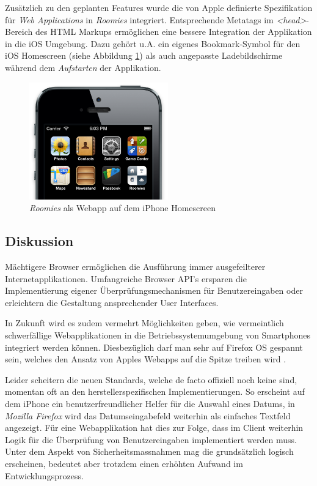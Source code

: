 Zusätzlich zu den geplanten Features wurde die von Apple definierte Spezifikation für \emph{Web Applications} \cite{SafariWebApp} in \emph{Roomies} integriert. Entsprechende Metatags im \emph{<head>}-Bereich des HTML Markups ermöglichen eine bessere Integration der Applikation in die iOS Umgebung. Dazu gehört u.A. ein eigenes Bookmark-Symbol für den iOS Homescreen (siehe Abbildung \ref{fig:webapp-homescreen-icon}) als auch angepasste Ladebildschirme während dem \emph{Aufstarten} der Applikation.

\begin{figure}[H]
	\centering
	\includegraphics[width=6cm]{content/principle-demonstration/images/ios-webapp-homescreenicon.png}
	\caption{\emph{Roomies} als Webapp auf dem iPhone Homescreen}
	\label{fig:webapp-homescreen-icon}
\end{figure}


\subsection*{Diskussion}

Mächtigere Browser ermöglichen die Ausführung immer ausgefeilterer Internetapplikationen. Umfangreiche Browser API's ersparen die Implementierung eigener Überprüfungsmechanismen für Benutzereingaben oder erleichtern die Gestaltung ansprechender User Interfaces.

In Zukunft wird es zudem vermehrt Möglichkeiten geben, wie vermeintlich schwerfällige Webapplikationen in die Betriebssystemumgebung von Smartphones integriert werden können. Diesbezüglich darf man sehr auf Firefox OS gespannt sein, welches den Ansatz von Apples Webapps auf die Spitze treiben wird \cite{FirefoxOSWebApp}.

Leider scheitern die neuen Standards, welche de facto offiziell noch keine sind, momentan oft an den herstellerspezifischen Implementierungen. So erscheint auf dem iPhone ein benutzerfreundlicher Helfer für die Auswahl eines Datums, in \emph{Mozilla Firefox} \cite{CanIUseDateInput} wird das Datumseingabefeld weiterhin als einfaches Textfeld angezeigt. Für eine Webapplikation hat dies zur Folge, dass im Client weiterhin Logik für die Überprüfung von Benutzereingaben implementiert werden muss. Unter dem Aspekt von Sicherheitsmassnahmen mag die grundsätzlich logisch erscheinen, bedeutet aber trotzdem einen erhöhten Aufwand im Entwicklungsprozess.

